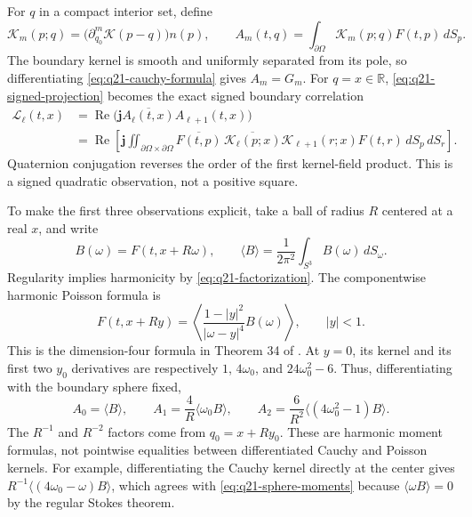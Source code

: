 \documentclass[11pt]{article}
\numberwithin{equation}{section}
\theoremstyle{definition}
\theoremstyle{remark}
\newcommand{\Lag}{\mathscr L}
\begin{document}
For \(q\) in a compact interior set, define
\[
 \mathcal K_m(p;q)=
     \bigl(\partial_{q_0}^m\mathcal K(p-q)\bigr)n(p),
 \qquad
 A_m(t,q)=\int_{\partial\Omega}\mathcal K_m(p;q)F(t,p)\,dS_p.
\]
The boundary kernel is smooth and uniformly separated from its pole,
so differentiating \eqref{eq:q21-cauchy-formula} gives \(A_m=G_m\).
For \(q=x\in\mathbb R\),
\eqref{eq:q21-signed-projection} becomes the exact signed boundary
correlation
\begin{align}
 \Lag_\ell(t,x)
 &=\operatorname{Re}\bigl(\mathbf j\overline{A_\ell(t,x)}A_{\ell+1}(t,x)\bigr)
 \label{eq:q21-boundary-laguerre}\\
 &=\operatorname{Re}\left[
 \mathbf j\iint_{\partial\Omega\times\partial\Omega}
 \overline{F(t,p)}\,\overline{\mathcal K_\ell(p;x)}
 \mathcal K_{\ell+1}(r;x)F(t,r)\,dS_p\,dS_r\right].
 \nonumber
\end{align}
Quaternion conjugation reverses the order of the first kernel-field
product. This is a signed quadratic observation, not a positive square.

To make the first three observations explicit, take a ball of radius
\(R\) centered at a real \(x\), and write
\[
 B(\omega)=F(t,x+R\omega),\qquad
 \langle B\rangle=\frac1{2\pi^2}\int_{S^3}B(\omega)\,dS_\omega.
\]
Regularity implies harmonicity by \eqref{eq:q21-factorization}.
The componentwise harmonic Poisson formula is
\begin{equation}
 F(t,x+Ry)=\left\langle
 \frac{1-|y|^2}{|\omega-y|^4}B(\omega)\right\rangle,
 \qquad |y|<1.
 \label{eq:q21-poisson-formula}
\end{equation}
This is the dimension-four formula in Theorem 34 of
\cite{frenkellibine}. At \(y=0\), its kernel and its first two
\(y_0\) derivatives are respectively
\(1\), \(4\omega_0\), and \(24\omega_0^2-6\).
Thus, differentiating with the boundary sphere fixed,
\begin{equation}
 \boxed{
 A_0=\langle B\rangle,
 \qquad A_1=\frac4R\langle\omega_0B\rangle,
 \qquad A_2=\frac6{R^2}\langle(4\omega_0^2-1)B\rangle.}
 \label{eq:q21-sphere-moments}
\end{equation}
The \(R^{-1}\) and \(R^{-2}\) factors come from
\(q_0=x+Ry_0\). These are harmonic moment formulas, not pointwise
equalities between differentiated Cauchy and Poisson kernels.
For example, differentiating the Cauchy kernel directly at the center
gives \(R^{-1}\langle(4\omega_0-\omega)B\rangle\), which agrees
with \eqref{eq:q21-sphere-moments} because
\(\langle\omega B\rangle=0\) by the regular Stokes theorem.
\end{document}
